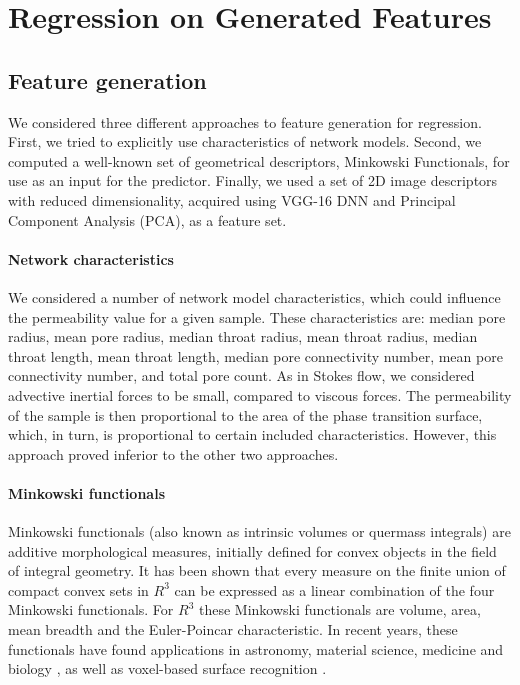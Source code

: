 \documentclass[review]{elsarticle}
\begin{document}
\section{Regression on Generated Features}

\subsection{Feature generation}

We considered three different approaches to feature generation for regression. First, we tried to explicitly use characteristics of network models. Second, we computed a well-known set of geometrical descriptors, Minkowski Functionals, for use as an input for the predictor. Finally, we used a set of 2D image descriptors with reduced dimensionality, acquired using VGG-16 DNN and Principal Component Analysis (PCA), as a feature set.

\paragraph{Network characteristics}

We considered a number of network model characteristics, which could influence the permeability value for a given sample. These characteristics are: median pore radius, mean pore radius, median throat radius, mean throat radius, median throat length, mean throat length, median pore connectivity number, mean pore connectivity number, and total pore count.
As in Stokes flow, we considered advective inertial forces to be small, compared to viscous forces. The permeability of the sample is then proportional to the area of the phase transition surface, which, in turn, is proportional to certain included characteristics.
However, this approach proved inferior to the other two approaches.

\paragraph{Minkowski functionals}

Minkowski functionals (also known as intrinsic volumes or quermass integrals) are additive morphological measures, initially defined for convex objects in the field of integral geometry. It has been shown that every measure on the finite union of compact convex sets in $R^3$ can be expressed as a linear combination of the four Minkowski functionals. For $R^3$ these Minkowski functionals are volume, area, mean breadth and the Euler-Poincar characteristic. In recent years, these functionals have found applications in astronomy, material science, medicine and biology \cite{blasquez2003efficient,guderlei2007algorithms,berchtold2007modelling,vogel2010quantification}, as well as voxel-based surface recognition \cite{yarotsky2017geometric}.
\end{document}
